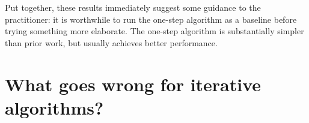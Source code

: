 Put together, these results immediately suggest some guidance to the practitioner: it is worthwhile to run the one-step algorithm as a baseline before trying something more elaborate. The one-step algorithm is substantially simpler than prior work, but usually achieves better performance.















\section{What goes wrong for iterative algorithms?}\label{sec:why}




